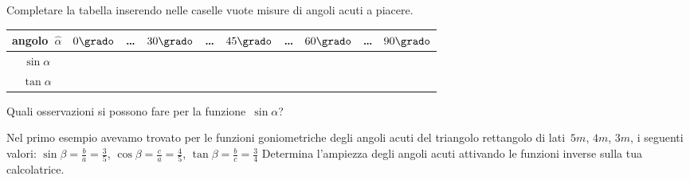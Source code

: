 \begin{esercizio}
\label{ese:G.4}
Completare la tabella inserendo nelle caselle vuote misure di angoli acuti a 
piacere.
\begin{center}
\begin{tabular}{cccccccccc}
\toprule
angolo~$\hat{\alpha}$ & $0\grado$ & \ldots & $30\grado$ & \ldots & $45\grado$ & 
\ldots & $60\grado$ & \ldots & $90\grado$\\
\midrule
$\sin \alpha$ & & & & &  &  &  &  &  \\
$\tan \alpha$ & & &  &  &  &  &  &  &  \\
\bottomrule
\end{tabular}
\end{center}

Quali osservazioni si possono fare per la funzione~$\sin \alpha$?
\end{esercizio}

\begin{esercizio}
\label{ese:G.5}
Nel primo esempio avevamo trovato per le funzioni goniometriche degli angoli 
acuti del triangolo rettangolo di lati~$5\unit{m}$,
$4\unit{m}$, $3\unit{m}$, i seguenti valori:
$\sin \beta = \frac{b}{a}=\frac{3}{5}$, $\cos \beta = \frac{c}{a}=\frac{4}{5}$, 
$\tan \beta = \frac{b}{c}=\frac{3}{4}$
Determina l'ampiezza degli angoli acuti attivando le funzioni inverse sulla tua 
calcolatrice.
\end{esercizio}
% 
% 


